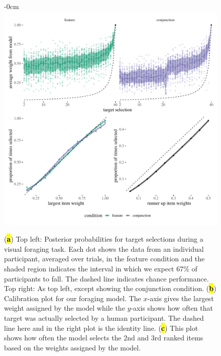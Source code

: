 \documentclass[vision,article,accept,pdftex,moreauthors]{Definitions/mdpi}
\begin{document}
\begin{figure}[H]
\begin{adjustwidth}{-\extralength}{0cm}
\centering
\includegraphics[width=17.8 cm]{Figures/qjep_preds.pdf}
\end{adjustwidth}
\caption{({\textbf{\hl{a}}}) Top left: Posterior probabilities for target selections during a visual foraging task. Each dot shows the data from an individual participant, averaged over trials, in the feature condition and the shaded region indicates the interval in which we expect 67\% of participants to fall. The dashed line indicates chance performance. Top right: As top left, except showing the conjunction condition. (\textbf{\hl{b}})  Calibration plot for our foraging model. The $x$-axis gives the largest weight assigned by the model while the $y$-axis shows how often that target was actually selected by a human participant. The dashed line here and in the right plot is the identity line. (\textbf{\hl{c}}) This plot shows how often the model selects the 2nd and 3rd ranked items based on the weights assigned by the model.} %




\end{figure}
\end{document}
